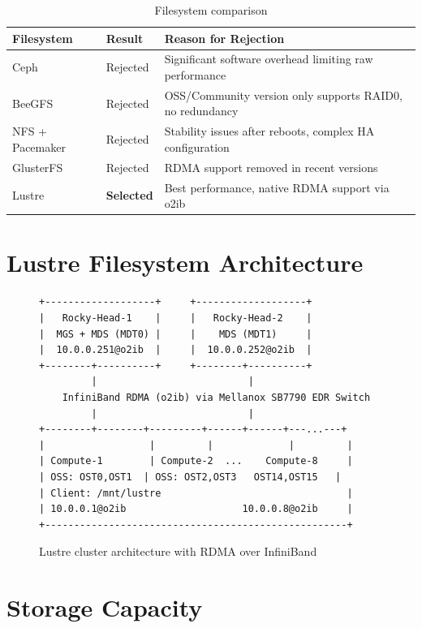 \begin{table}[h]
\centering
\caption{Filesystem comparison}
\label{tab:fs-comparison}
\begin{tabular}{llp{7cm}}
\hline
\textbf{Filesystem} & \textbf{Result} & \textbf{Reason for Rejection} \\
\hline
Ceph & Rejected & Significant software overhead limiting raw performance \\
BeeGFS & Rejected & OSS/Community version only supports RAID0, no redundancy \\
NFS + Pacemaker & Rejected & Stability issues after reboots, complex HA configuration \\
GlusterFS & Rejected & RDMA support removed in recent versions \\
Lustre & \textbf{Selected} & Best performance, native RDMA support via o2ib \\
\hline
\end{tabular}
\end{table}

\section{Lustre Filesystem Architecture}

\begin{figure}[h]
\centering
\begin{verbatim}
+-------------------+     +-------------------+
|   Rocky-Head-1    |     |   Rocky-Head-2    |
|  MGS + MDS (MDT0) |     |    MDS (MDT1)     |
|  10.0.0.251@o2ib  |     |  10.0.0.252@o2ib  |
+--------+----------+     +--------+----------+
         |                          |
    InfiniBand RDMA (o2ib) via Mellanox SB7790 EDR Switch
         |                          |
+--------+--------+---------+------+------+---...---+
|                  |         |             |         |
| Compute-1        | Compute-2  ...    Compute-8     |
| OSS: OST0,OST1  | OSS: OST2,OST3   OST14,OST15   |
| Client: /mnt/lustre                                |
| 10.0.0.1@o2ib                    10.0.0.8@o2ib     |
+----------------------------------------------------+
\end{verbatim}
\caption{Lustre cluster architecture with RDMA over InfiniBand}
\label{fig:lustre-arch}
\end{figure}

\section{Storage Capacity}

